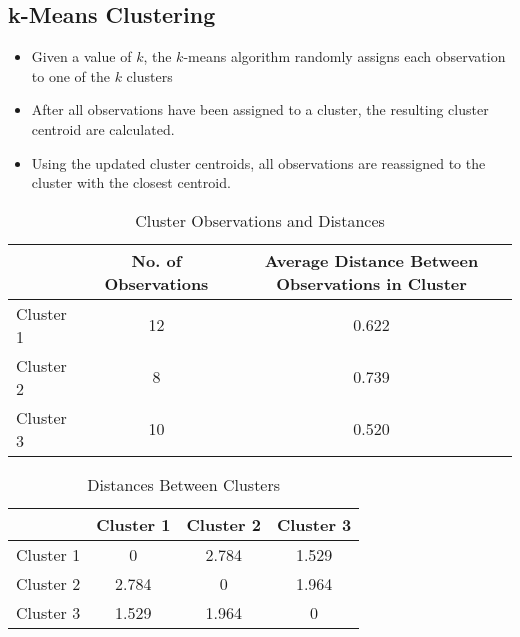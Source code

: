 \documentclass{report}
\begin{document}
\subsection{k-Means Clustering}
\begin{itemize}
  \item Given a value of $k$, the $k$-means algorithm randomly assigns each observation to one of the $k$ clusters 
  \item After all observations have been assigned to a cluster, the resulting cluster centroid are calculated.
  \item Using the updated cluster centroids, all observations are reassigned to the cluster with the closest centroid.
\end{itemize}
\begin{table}[h]
\centering
\begin{tabular}{@{}lcc@{}}
\toprule
             & No. of Observations & Average Distance Between Observations in Cluster \\ \midrule
Cluster 1 & 12                 & 0.622                                           \\
Cluster 2 & 8                  & 0.739                                           \\
Cluster 3 & 10                 & 0.520                                           \\ \bottomrule
\end{tabular}
\caption{Cluster Observations and Distances}
\end{table}
\bigbreak \noindent
\begin{table}[h]
\centering
\begin{tabular}{@{}lccc@{}}
\toprule
          & Cluster 1 & Cluster 2 & Cluster 3 \\ \midrule
Cluster 1 & 0         & 2.784     & 1.529     \\
Cluster 2 & 2.784     & 0         & 1.964     \\
Cluster 3 & 1.529     & 1.964     & 0         \\ \bottomrule
\end{tabular}
\caption{Distances Between Clusters}
\end{table}
\end{document}
